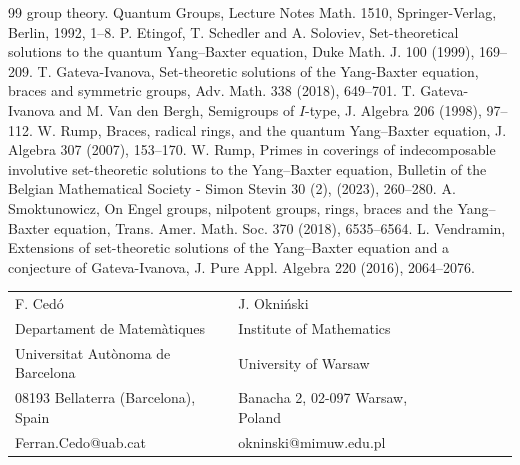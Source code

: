 \documentclass[10pt]{article}
\begin{document}
\begin{thebibliography}{99}
group theory. Quantum Groups, Lecture Notes Math. 1510,
Springer-Verlag, Berlin, 1992, 1--8.
 P. Etingof, T. Schedler and A.
Soloviev, Set-theoretical solutions to the quantum Yang--Baxter
equation, Duke Math. J. 100 (1999), 169--209.
 T. Gateva-Ivanova, Set-theoretic solutions of the Yang-Baxter equation,
braces and symmetric groups, Adv. Math. 338 (2018), 649--701.
 T. Gateva-Ivanova and M. Van den Bergh,
Semigroups of $I$-type, J. Algebra 206 (1998), 97--112.
 W. Rump,
Braces, radical rings, and the quantum Yang--Baxter equation, J.
Algebra 307 (2007), 153--170.
 W. Rump, Primes in coverings of indecomposable involutive set-theoretic solutions to the Yang--Baxter equation, Bulletin of the Belgian Mathematical Society - Simon Stevin 30 (2), (2023), 260--280.
 A. Smoktunowicz, On Engel groups, nilpotent groups,
rings, braces and the Yang--Baxter equation, Trans. Amer. Math.
Soc. 370 (2018), 6535--6564.
 L. Vendramin, Extensions of set-theoretic solutions of the Yang--Baxter
equation and a conjecture of Gateva-Ivanova, J. Pure Appl. Algebra
220 (2016), 2064--2076.
\end{thebibliography}







\vspace{30pt}
 \noindent \begin{tabular}{llllllll}
  F. Ced\'o && J. Okni\'{n}ski \\
 Departament de Matem\`atiques &&  Institute of
Mathematics \\
 Universitat Aut\`onoma de Barcelona &&   University of Warsaw\\
08193 Bellaterra (Barcelona), Spain    &&  Banacha 2, 02-097 Warsaw, Poland \\
 Ferran.Cedo@uab.cat && okninski@mimuw.edu.pl\\

\end{tabular}
\end{document}
